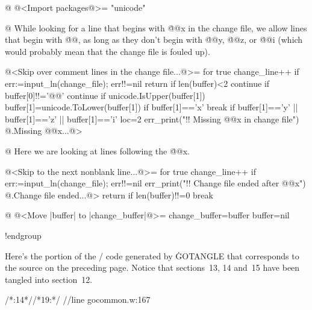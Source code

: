 @ @<Import packages@>=
"unicode"

@ While looking for a line that begins with \.{@@x} in the change file, we
allow lines that begin with \.{@@}, as long as they don't begin with \.{@@y},
\.{@@z}, or \.{@@i} (which would probably mean that the change file is fouled up).

@<Skip over comment lines in the change file...@>=
for true {
        change_line++
        if err:=input_ln(change_file); err!!=nil {
                return
        }
        if len(buffer)<2 {
                continue
        }
        if buffer[0]!!='@@' {
                continue
        }
        if unicode.IsUpper(buffer[1]) {
                buffer[1]=unicode.ToLower(buffer[1])
        }
        if buffer[1]=='x' {
                break
        }
        if buffer[1]=='y' || buffer[1]=='z' || buffer[1]=='i' {
                loc=2
                err_print("!! Missing @@x in change file")
                @.Missing @@x...@>
        }
}

@ Here we are looking at lines following the \.{@@x}.

@<Skip to the next nonblank line...@>=
for true {
        change_line++
        if err:=input_ln(change_file); err!!=nil {
                err_print("!! Change file ended after @@x")
                @.Change file ended...@>
                return
        }
        if len(buffer)!!=0 {
                break
        }
}

@ @<Move |buffer| to |change_buffer|@>=
{
        change_buffer=buffer
        buffer=nil
}

!endgroup
\endgroup
\vfill\eject

\def\runninghead{APPENDIX A  --- TRANSLATION BY {\tentt GOTANGLE}}

Here's the portion of the \GO/ code generated by \.{GOTANGLE} that corresponds
to the source on the preceding page.  Notice that sections~13, 14 and~15
have been tangled into section~12.

\vskip6pt
\begingroup \def\tt{\eighttt} \baselineskip9pt
\verbatim

/*:14*//*19:*/
//line gocommon.w:167

